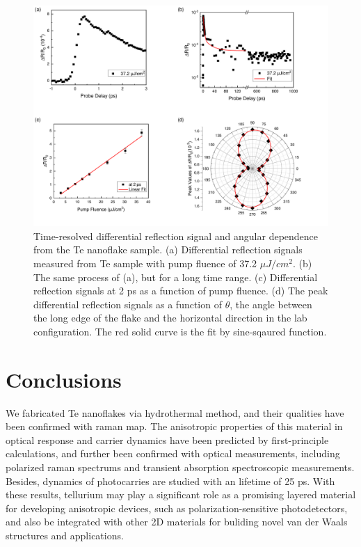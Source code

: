 \documentclass[journal=jacsat,manuscript=article]{achemso}
\begin{document}
\begin{figure}
  \centering
  \includegraphics[width=\linewidth]{TA.pdf}
  \caption{Time-resolved differential reflection signal and angular dependence from the Te nanoflake sample. (a) Differential reflection signals measured from Te sample with pump fluence of 37.2 $\mu J/cm^2$. (b) The same process of (a), but for a long time range. (c) Differential reflection signals at 2 ps as a function of pump fluence. (d) The peak differential reflection signals as a function of $\theta$, the angle between the long edge of the flake and the horizontal direction in the lab configuration. The red solid curve is the fit by sine-sqaured function.}
    \label{fig:TA}
\end{figure}

\section{Conclusions}
We fabricated Te nanoflakes via hydrothermal method, and their qualities have been confirmed with raman map. The anisotropic properties of this material in optical response and carrier dynamics have been predicted by first-principle calculations, and further been confirmed with optical measurements, including polarized raman spectrums and transient absorption spectroscopic measurements. Besides, dynamics of photocarries are studied with an lifetime of 25 ps. With these results, tellurium may play a significant role as a promising layered material for developing  anisotropic devices, such as polarization-sensitive photodetectors, and also be integrated with other 2D materials for buliding novel van der Waals structures and applications.
\end{document}
